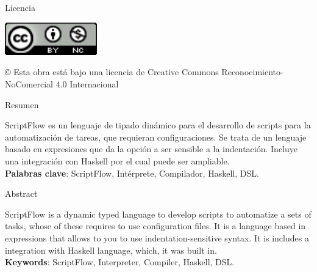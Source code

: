 \documentclass[11pt]{article}
\begin{document}
\newpage
\begin{flushleft}
  {\huge  Licencia }\\[2ex]
\end{flushleft}

\begin{center}
  \includegraphics[width=40mm]{license.png}\\[4ex]
\end{center}
© Esta obra está bajo una licencia de Creative Commons Reconocimiento-NoComercial 4.0 Internacional

\newpage
\begin{center}
  {\huge  Resumen }\\[2ex]
\end{center}

{\fontsize{14}{11}\selectfont
   ScriptFlow es un lenguaje de tipado dinámico para el desarrollo de scripts para la automatización de tareas, que requieran configuraciones.
   Se trata de un lenguaje basado en expresiones que da la opción a ser sensible a la indentación. Incluye una integración con Haskell por el
   cual puede ser ampliable.
}\\
\vspace{50mm}
\textbf{Palabras clave}: ScriptFlow, Intérprete, Compilador, Haskell, DSL.

\newpage
\begin{center}
  {\huge  Abstract }\\[2ex]
\end{center}

{\fontsize{14}{11}\selectfont
   ScriptFlow is a dynamic typed language to develop scripts to automatize a sets of tasks, whose of these requires to use configuration files.
   It is a language based in expressions that allows to you to use indentation-sensitive syntax. It is includes a integration with Haskell language,
   which, it was built in.
}\\
\vspace{50mm}
\textbf{Keywords}: ScriptFlow, Interpreter, Compiler, Haskell, DSL.

\newpage

\renewcommand{\contentsname}{Índice general}

\tableofcontents

\newpage

\printglossary[type=\acronymtype,title=Acrónimos]
\end{document}

